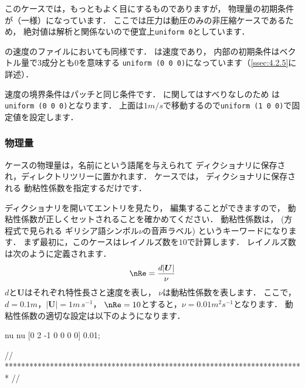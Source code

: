 このケースでは，もっともよく目にするものでありますが，
物理量の初期条件が（一様）になっています．
ここでは圧力は動圧のみの非圧縮ケースであるため，
絶対値は解析と関係ないので便宜上\texttt{uniform 0}としています．

の速度のファイルにおいても同様です．
は速度であり，
内部の初期条件はベクトル量で3成分とも$0$を意味する
\texttt{uniform (0 0 0)}になっています（\autoref{ssec:4.2.5}に詳述）．

速度の境界条件はパッチと同じ条件です．
に関してはすべりなしのため
%
%
は\texttt{uniform (0 0 0)}となります．
上面は$1\unit{m/s}$で移動するので\texttt{uniform (1 0 0)}で固定値を設定します．

\subsubsection{物理量}
\label{sssec:2.1.1.3}
ケースの物理量は，名前にという語尾を与えられて
ディクショナリに保存され，ディレクトリツリーに置かれます．
%
%
ケースでは，
%
%
ディクショナリに保存される
動粘性係数を指定するだけです．

ディクショナリを開いてエントリを見たり，
編集することができますので，
%
動粘性係数が正しくセットされることを確かめてください．
動粘性係数は， (方程式で見られる
ギリシア語シンボル$\nu$の音声ラベル)
というキーワードになります．
まず最初に，このケースはレイノルズ数を$10$で計算します．
%
レイノルズ数は次のように定義されます．
\begin{align}
 \label{eq:2.1}
 \nRe = \frac{d|\bm{U}|}{\nu}
\end{align}
$d$と$\bm{U}$はそれぞれ特性長さと速度を表し，
$\nu$は動粘性係数を表します．
ここで，$d = 0.1\unit{m}$，$|\bm{U}| = 1\unit{m\,s^{-1}}$，
$\nRe = 10$とすると，$\nu = 0.01\unit{m^{2}s^{-1}}$となります．
動粘性係数の適切な設定は以下のようになります．
\begin{OFverbatim}[file, linenum=17]

nu              nu [0 2 -1 0 0 0 0] 0.01;


// ************************************************************************* //
\end{OFverbatim}


